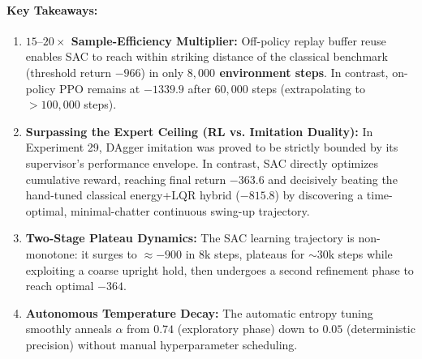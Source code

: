 \documentclass[11pt,a4paper]{article}
\begin{document}
\begin{table}[H]
\centering
\small
{}
\caption{Benchmark results for Experiment 31: SAC vs. PPO sample efficiency on Inverted Pendulum swing-up (from \texttt{experiments/31\_sac\_vs\_ppo\_sample\_efficiency/table.md}).}
\label{tab:exp31}
\end{table}

\paragraph{Key Takeaways:}
\begin{enumerate}[nosep]
  \item \textbf{$15\text{--}20\times$ Sample-Efficiency Multiplier:} Off-policy replay buffer reuse enables SAC to reach within striking distance of the classical benchmark (threshold return $-966$) in only \textbf{$8,000$ environment steps}. In contrast, on-policy PPO remains at $-1339.9$ after $60,000$ steps (extrapolating to $>100,000$ steps).
  \item \textbf{Surpassing the Expert Ceiling (RL vs. Imitation Duality):} In Experiment 29, DAgger imitation was proved to be strictly bounded by its supervisor's performance envelope. In contrast, SAC directly optimizes cumulative reward, reaching final return \textbf{$-363.6$} and decisively beating the hand-tuned classical energy+LQR hybrid ($-815.8$) by discovering a time-optimal, minimal-chatter continuous swing-up trajectory.
  \item \textbf{Two-Stage Plateau Dynamics:} The SAC learning trajectory is non-monotone: it surges to $\approx -900$ in $8\text{k}$ steps, plateaus for $\sim 30\text{k}$ steps while exploiting a coarse upright hold, then undergoes a second refinement phase to reach optimal $-364$.
  \item \textbf{Autonomous Temperature Decay:} The automatic entropy tuning smoothly anneals $\alpha$ from $0.74$ (exploratory phase) down to $0.05$ (deterministic precision) without manual hyperparameter scheduling.
\end{enumerate}
\end{document}
